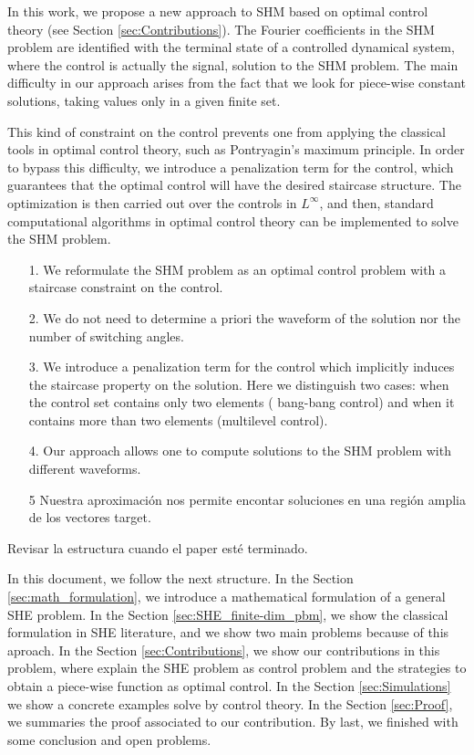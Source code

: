 \documentclass[twocolumn]{autart}    %
\begin{document}
In this work, we propose a new approach to SHM based on optimal control theory (see Section \ref{sec:Contributions}). The Fourier coefficients in the SHM problem are identified with the terminal state of a controlled dynamical system, where the control is actually the signal, solution to the SHM problem. The main difficulty in our approach arises from the fact that we look for piece-wise constant solutions, taking values only in a given finite set.

This kind of constraint on the control prevents one from applying the classical tools in optimal control theory, such as Pontryagin's maximum principle. In order to bypass this difficulty, we introduce a penalization term for the control, which guarantees that the optimal control will have the desired staircase structure. The optimization is then carried out over the controls in $L^\infty$, and then, standard computational algorithms in optimal control theory can be implemented to solve the SHM problem. 

\begin{enumerate}
    \item[1.] We reformulate the SHM problem as an optimal control problem with a staircase constraint on the control.
	\item[2.] We do not need to determine a priori the waveform of the solution nor the number of switching angles.  
    \item[3.] We introduce a penalization term for the control which implicitly induces the staircase property on the solution. Here we distinguish two cases: when the control set contains only two elements ( bang-bang control) and when it contains more than two elements (multilevel control).
    \item[4.] Our approach allows one to compute solutions to the SHM problem with different waveforms.
    \JOStart
    \item[5 ] Nuestra aproximación nos permite encontar soluciones en una región amplia de los vectores target.
\end{enumerate}

{\color{red} Revisar la estructura cuando el paper est\'e terminado.

In this document, we follow the next structure. In the Section \ref{sec:math_formulation}, we introduce a mathematical formulation of a general SHE problem. 
%
In the Section \ref{sec:SHE_finite-dim_pbm}, we show the classical formulation in SHE literature, and we show two main problems because of this aproach. 
%
In the Section \ref{sec:Contributions}, we show our contributions in this problem, where explain the SHE problem as control problem and the strategies to obtain a piece-wise function as optimal control. 
%
In the Section \ref{sec:Simulations} we show a concrete examples solve by control theory. 
%
In the Section \ref{sec:Proof}, we summaries the proof associated to our contribution. 
%
By last, we finished with some conclusion and open problems. 
}
\end{document}
